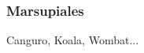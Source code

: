 \documentclass{beamer}
\begin{document}
 \frametitle{Marsupiales}
    Canguro, Koala, Wombat...
\end{document}
